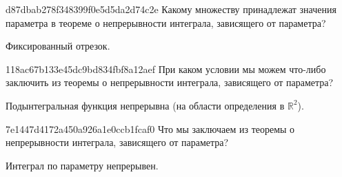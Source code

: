 \begin{note}{d87dbab278f348399f0e5d5da2d74c2e}
    Какому множеству принадлежат значения параметра в теореме о непрерывности интеграла, зависящего от параметра?

    \begin{cloze}{1}
        Фиксированный отрезок.
    \end{cloze}
\end{note}

\begin{note}{118ac67b133e45dc9bd834fbf8a12aef}
    При каком условии мы можем что-либо заключить из теоремы о непрерывности интеграла, зависящего от параметра?

    \begin{cloze}{1}
        Подынтегральная функция непрерывна (на области определения в \({ \mathbb R^2 }\)).
    \end{cloze}
\end{note}

\begin{note}{7e1447d4172a450a926a1e0ccb1fcaf0}
    Что мы заключаем из теоремы о непрерывности интеграла, зависящего от параметра?

    \begin{cloze}{1}
        Интеграл по параметру непрерывен.
    \end{cloze}
\end{note}


